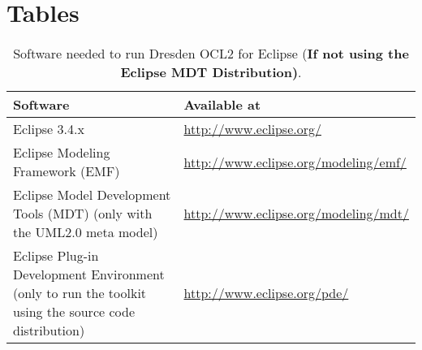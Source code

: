 \cleardoublepage
{}
{}
\chapter*{Tables}

\begin{table}[h]
\begin{tabular}{|p{7cm}|p{7cm}|}
    \hline
    \textbf{Software} & \textbf{Available at} \\
    \hline
    Eclipse 3.4.x & \url{http://www.eclipse.org/} \\
    \hline
    Eclipse Modeling Framework (EMF) & \url{http://www.eclipse.org/modeling/emf/} \\
    \hline
    Eclipse Model Development Tools (MDT) (only with the UML2.0 meta model) & \url{http://www.eclipse.org/modeling/mdt/} \\
    \hline
    Eclipse Plug-in Development Environment (only to run the toolkit using the source code distribution) & \url{http://www.eclipse.org/pde/} \\
    \hline
\end{tabular}
\caption{Software needed to run Dresden OCL2 for Eclipse (\textbf{If not using the Eclipse MDT Distribution)}.}
\label{tab:software}
\end{table}



